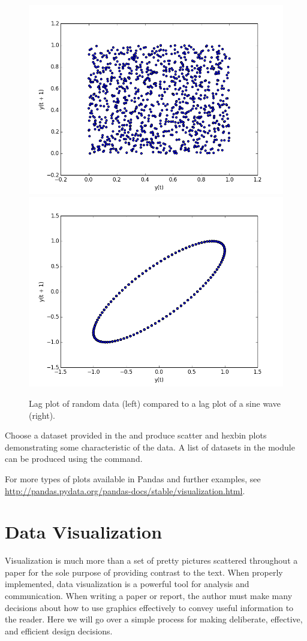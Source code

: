 \begin{figure}[H]
    \centering
    \includegraphics[width=.49\textwidth]{randomdata.png}
    \includegraphics[width=.49\textwidth]{structureddata.png}
    \caption{Lag plot of random data (left) compared to a lag plot of a sine wave (right).}
\end{figure}


\begin{problem}
Choose a dataset provided in the  and produce scatter and hexbin plots demonstrating some characteristic of the data. A list of datasets in the  module can be produced using the  command.
\end{problem}

For more types of plots available in Pandas and further examples, see \url{http://pandas.pydata.org/pandas-docs/stable/visualization.html}.

\section*{Data Visualization}

Visualization is much more than a set of pretty pictures scattered throughout a paper for the sole purpose of providing contrast to the text.
When properly implemented, data visualization is a powerful tool for analysis and communication.
When writing a paper or report, the author must make many decisions about how to use graphics effectively to convey useful information to the reader.  Here we will go over a simple process for making deliberate, effective, and efficient design decisions.

